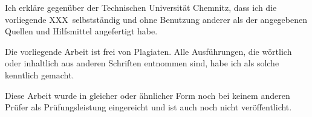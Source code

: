\begin{tucerklaerung}
Ich erkläre gegenüber der Technischen Universität Chemnitz, dass ich die
vorliegende XXX\ selbstständig und ohne Benutzung anderer
als der angegebenen Quellen und Hilfsmittel angefertigt habe.

Die vorliegende Arbeit ist frei von Plagiaten. Alle Ausführungen, die wörtlich
oder inhaltlich aus anderen Schriften entnommen sind, habe ich als solche
kenntlich gemacht.

Diese Arbeit wurde in gleicher oder ähnlicher Form noch bei keinem anderen
Prüfer als Prüfungsleistung eingereicht und ist auch noch nicht veröffentlicht.

\end{tucerklaerung}
